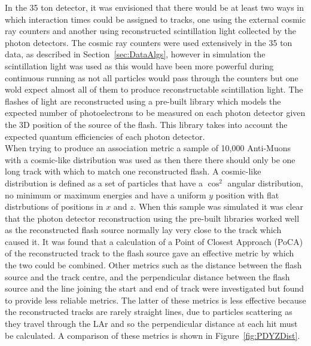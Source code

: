 In the 35 ton detector, it was envisioned that there would be at least two ways in which interaction times could be assigned to tracks, one using the external cosmic ray counters and another using reconstructed scintillation light collected by the photon detectors. The cosmic ray counters were used extensively in the 35 ton data, as described in Section~\ref{sec:DataAlgs}, however in simulation the scintillation light was used as this would have been more powerful during continuous running as not all particles would pass through the counters but one wold expect almost all of them to produce reconstructable scintillation light. The flashes of light are reconstructed using a pre-built library which models the expected number of photoelectrons to be measured on each photon detector given the 3D position of the source of the flash. This library takes into account the expected quantum efficiencies of each photon detector. \\

When trying to produce an association metric a sample of 10,000 Anti-Muons with a cosmic-like distribution was used as then there there should only be one long track with which to match one reconstructed flash. A cosmic-like distribution is defined as a set of particles that have a $\cos^{2}$ angular distribution, no minimum or maximum energies and have a uniform $y$ position with flat distrbutions of positions in $x$ and $z$. When this sample was simulated it was clear that the photon detector reconstruction using the pre-built libraries worked well as the reconstructed flash source normally lay very close to the track which caused it. It was found that a calculation of a Point of Closest Approach (PoCA) of the reconstructed track to the flash source gave an effective metric by which the two could be combined. Other metrics such as the distance between the flash source and the track centre, and the perpendicular distance between the flash source and the line joining the start and end of track were investigated but found to provide less reliable metrics. The latter of these metrics is less effective because the reconstructed tracks are rarely straight lines, due to particles scattering as they travel through the LAr and so the perpendicular distance at each hit must be calculated. A comparison of these metrics is shown in Figure~\ref{fig:PDYZDist}. \\

